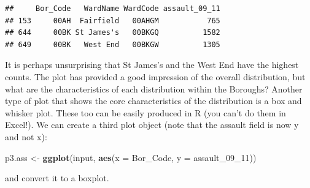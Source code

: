 \documentclass[]{article}
\newenvironment{Shaded}{}{}
\newcommand{\KeywordTok}[1]{\textcolor[rgb]{0.00,0.44,0.13}{\textbf{{#1}}}}
\newcommand{\DataTypeTok}[1]{\textcolor[rgb]{0.56,0.13,0.00}{{#1}}}
\newcommand{\DecValTok}[1]{\textcolor[rgb]{0.25,0.63,0.44}{{#1}}}
\newcommand{\NormalTok}[1]{{#1}}
\begin{document}
\begin{Shaded}
\end{Shaded}
\begin{verbatim}
##     Bor_Code   WardName WardCode assault_09_11
## 153     00AH  Fairfield   00AHGM           765
## 644     00BK St James's   00BKGQ          1582
## 649     00BK   West End   00BKGW          1305
\end{verbatim}
It is perhaps unsurprising that St James's and the West End have the
highest counts. The plot has provided a good impression of the overall
distribution, but what are the characteristics of each distribution
within the Boroughs? Another type of plot that shows the core
characteristics of the distribution is a box and whisker plot. These too
can be easily produced in R (you can't do them in Excel!). We can create
a third plot object (note that the assault field is now y and not x):

\begin{Shaded}
\begin{Highlighting}[]
\NormalTok{p3.ass <- }\KeywordTok{ggplot}\NormalTok{(input, }\KeywordTok{aes}\NormalTok{(}\DataTypeTok{x =} \NormalTok{Bor_Code, }\DataTypeTok{y =} \NormalTok{assault_09_11))}
\end{Highlighting}
\end{Shaded}
and convert it to a boxplot.
\end{document}
